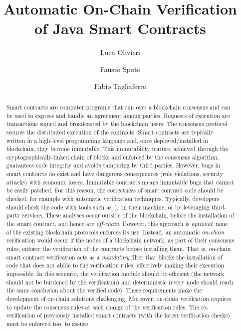 \documentclass{easychair}
\title{Automatic On-Chain Verification of Java Smart Contracts}
\author{
Luca Olivieri\inst{1,2}
\and
Fausto Spoto\inst{1}
\and
Fabio Tagliaferro\inst{1}
}
\institute{
  Università degli Studi di Verona, Italy\\
  \email{\{luca.olivieri, fausto.spoto, fabio.tagliaferro\}@univr.it}
\and
   Corvallis S.r.l., Padova, Italy\\
 }
\begin{document}
\maketitle

\begin{abstract}
  Smart contracts are computer programs that run over a blockchain consensus and can be used to express and handle an agreement among parties.
  Requests of execution are transactions signed and broadcasted by the blockchain users.
  The consensus protocol secures the distributed execution of the contracts.
  Smart contracts are typically written in a high-level programming language and, once deployed/installed in blockchain, they become immutable.
  This immutability feature, achieved through the cryptogra\-phically-linked chain of blocks and enforced by the consensus algorithm,
  guarantees code integrity and avoids tampering by third parties.
  However, bugs in smart contracts do exist and have dangerous consequences (rule violations, security attacks) with economic losses.
  Immutable contracts means immutable bugs that cannot be easily patched.
  For this reason, the correctness of smart contract code should be checked, for example with automatic verification techniques.
  Typically, developers should check the code with tools such as~\cite{TIGR21, GriecoSCFG20, FeistGG19}), on their machine, or by leveraging third-party services.
  These analyses occur outside of the blockchain, before the installation of the smart contract, and hence are \emph{off-chain}.
  However, this approach is \emph{optional}: none of the existing blockchain protocols enforces its use.
  Instead, an automatic \emph{on-chain} verification would occur if the nodes of a blockchain network, as part of their consensus rules,
  enforce the verification of the contracts before installing them.
  That is, on-chain smart contract verification acts as a \emph{mandatory} filter that blocks the installation of code that does not abide to the verification rules,
  effectively making their execution impossible.
  In this scenario, the verification module should be efficient
  (the network should not be burdened by the verification) and deterministic (every node should reach the same conclusion about the verified code).
  These requirements make the development of on-chain solutions challenging.
  Moreover, on-chain verification requires to update the consensus rules at each change of the verification rules.
  The re-verification of previously installed smart contracts (with the latest verification checks) must be enforced too, to assure

\end{abstract}
\end{document}
